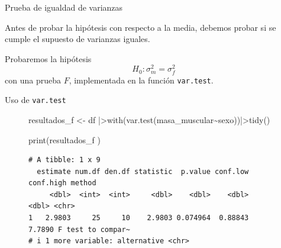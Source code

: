 \documentclass[
  ignorenonframetext,
]{beamer}
\newenvironment{Shaded}{\begin{snugshade}}{\end{snugshade}}
\newcommand{\FunctionTok}[1]{\textcolor[rgb]{0.28,0.35,0.67}{#1}}
\newcommand{\NormalTok}[1]{\textcolor[rgb]{0.00,0.23,0.31}{#1}}
\newcommand{\OtherTok}[1]{\textcolor[rgb]{0.00,0.23,0.31}{#1}}
\newcommand{\SpecialCharTok}[1]{\textcolor[rgb]{0.37,0.37,0.37}{#1}}
\begin{document}
\begin{frame}[fragile]{Prueba de igualdad de varianzas}
\label{prueba-de-igualdad-de-varianzas-1}
\begin{tcolorbox}[enhanced jigsaw, colbacktitle=quarto-callout-warning-color!10!white, coltitle=black, title=\textcolor{quarto-callout-warning-color}{\faExclamationTriangle}\hspace{0.5em}{Warning}, breakable, bottomrule=.15mm, colback=white, toprule=.15mm, bottomtitle=1mm, toptitle=1mm, titlerule=0mm, rightrule=.15mm, arc=.35mm, leftrule=.75mm, colframe=quarto-callout-warning-color-frame, opacitybacktitle=0.6, left=2mm, opacityback=0]

Antes de probar la hipótesis con respecto a la media, debemos probar si
se cumple el supuesto de varianzas iguales.

\end{tcolorbox}

Probaremos la hipótesis \[H_0:\sigma^2_m=\sigma^2_f\] con una prueba
\(F\), implementada en la función \texttt{var.test}.
\end{frame}

\begin{frame}[fragile]{Uso de \texttt{var.test}}
\label{uso-de-var.test-1}
\begin{figure}

\begin{Shaded}
\begin{Highlighting}[]
\NormalTok{resultados\_f }\OtherTok{\textless{}{-}}\NormalTok{ df }\SpecialCharTok{|\textgreater{}}\FunctionTok{with}\NormalTok{(}\FunctionTok{var.test}\NormalTok{(masa\_muscular}\SpecialCharTok{\textasciitilde{}}\NormalTok{sexo))}\SpecialCharTok{|\textgreater{}}\FunctionTok{tidy}\NormalTok{()}
\end{Highlighting}
\end{Shaded}

\end{figure}%

\begin{figure}

\begin{Shaded}
\begin{Highlighting}[]
\FunctionTok{print}\NormalTok{(resultados\_f ) }
\end{Highlighting}
\end{Shaded}

\begin{verbatim}
# A tibble: 1 x 9
  estimate num.df den.df statistic  p.value conf.low conf.high method           
     <dbl>  <int>  <int>     <dbl>    <dbl>    <dbl>     <dbl> <chr>            
1   2.9803     25     10    2.9803 0.074964  0.88843    7.7890 F test to compar~
# i 1 more variable: alternative <chr>
\end{verbatim}

\end{figure}%
\end{frame}
\end{document}

